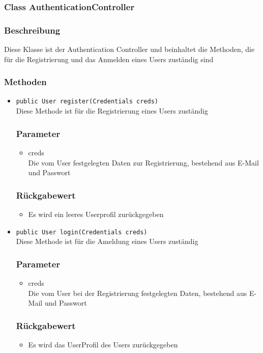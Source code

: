 \documentclass[a4paper]{scrreprt}
\begin{document}
\subsubsection{Class AuthenticationController}
\subsubsection*{Beschreibung}
Diese Klasse ist der Authentication Controller und beinhaltet die Methoden, die für die Registrierung und das Anmelden eines Users zuständig sind

\subsubsection*{Methoden}
\begin{addmargin}[25pt]{0pt}
\begin{itemize}

\item \texttt{public User register(Credentials creds)}\\
	Diese Methode ist für die Registrierung eines Users zuständig
	\subsubsection*{Parameter}
	\begin{itemize}
	\item creds \\
		Die vom User festgelegten Daten zur Registrierung, bestehend aus E-Mail und Passwort
	\end{itemize}
	\subsubsection*{Rückgabewert}
	\begin{itemize}
	\item Es wird ein leeres Userprofil zurückgegeben
	\end{itemize}
	
\item \texttt{public User login(Credentials creds)}\\
	Diese Methode ist für die Ameldung eines Users zuständig
	\subsubsection*{Parameter}
	\begin{itemize}
	\item creds \\
		Die vom User bei der Registrierung festgelegten Daten, bestehend aus E-Mail und Passwort
	\end{itemize}
	\subsubsection*{Rückgabewert}
	\begin{itemize}
	\item Es wird das UserProfil des Users zurückgegeben
	\end{itemize}

\end{itemize}
\end{addmargin}
\end{document}
